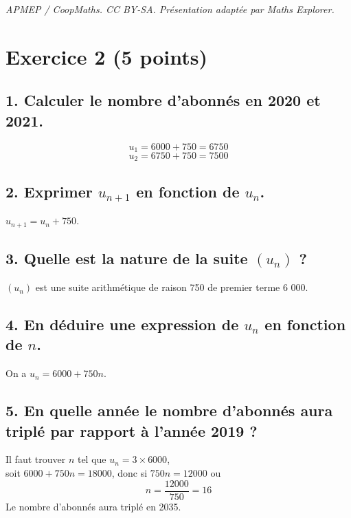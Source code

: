 \documentclass[10pt]{article}
\begin{document}
\noindent\textit{APMEP / CoopMaths. CC BY-SA. Présentation adaptée par Maths Explorer.}\par\medskip
\section*{Exercice 2 (5 points)}


\subsection*{1. Calculer le nombre d’abonnés en 2020 et 2021.}
	
\[	u_1 = 6000 + 750 = 6750\]
\[	u_2 = 6750 + 750 = 7500\]
	
	\subsection*{2. Exprimer $u_{n+1}$ en fonction de $u_n$.}
$u_{n+1} = u_n + 750$.
\subsection*{3. Quelle est la nature de la suite $(u_n)$ ?}
$(u_n)$ est une suite arithmétique de raison 750 de premier terme 6 000.
\subsection*{4. En déduire une expression de $u_n$ en fonction de $n$.}
On a $u_n = 6000 + 750n$.
\subsection*{5. En quelle année le nombre d’abonnés aura triplé par rapport à l’année 2019 ?}
Il faut trouver $n$ tel que $u_n = 3 \times 6000$,\\ soit $6000 + 750n = 18000$, donc si $750n = 12000$ ou
	\[
	n = \dfrac{12000}{750} = 16
	\]
Le nombre d’abonnés aura triplé en 2035.
\end{document}
